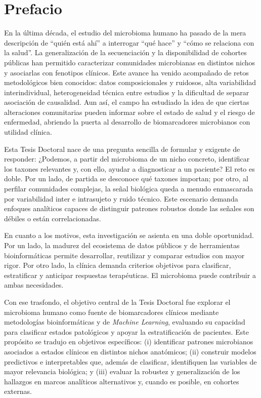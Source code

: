 
\chapter*{\textsf{\textbf{Prefacio}}}

En la última década, el estudio del microbioma humano ha pasado de la mera descripción de “quién está ahí” a interrogar “qué hace” y “cómo se relaciona con la salud”. La generalización de la secuenciación y la disponibilidad de cohortes públicas han permitido caracterizar comunidades microbianas en distintos nichos y asociarlas con fenotipos clínicos. Este avance ha venido acompañado de retos metodológicos bien conocidos: datos composicionales y ruidosos, alta variabilidad interindividual, heterogeneidad técnica entre estudios y la dificultad de separar asociación de causalidad. Aun así, el campo ha estudiado la idea de que ciertas alteraciones comunitarias pueden informar sobre el estado de salud y el riesgo de enfermedad, abriendo la puerta al desarrollo de biomarcadores microbianos con utilidad clínica. 

Esta Tesis Doctoral nace de una pregunta sencilla de formular y exigente de responder: ¿Podemos, a partir del microbioma de un nicho concreto, identificar los taxones relevantes y, con ello, ayudar a diagnosticar a un paciente? El reto es doble. Por un lado, de partida se desconoce qué taxones importan; por otro, al perfilar comunidades complejas, la señal biológica queda a menudo enmascarada por variabilidad inter e intrasujeto y ruido técnico. Este escenario demanda enfoques analíticos capaces de distinguir patrones robustos donde las señales son débiles o están correlacionadas.  

En cuanto a los motivos, esta investigación se asienta en una doble oportunidad. Por un lado, la madurez del ecosistema de datos públicos y de herramientas bioinformáticas permite desarrollar, reutilizar y comparar estudios con mayor rigor. Por otro lado, la clínica demanda criterios objetivos para clasificar, estratificar y anticipar respuestas terapéuticas. El microbioma puede contribuir a ambas necesidades. 

Con ese trasfondo, el objetivo central de la Tesis Doctoral fue explorar el microbioma humano como fuente de biomarcadores clínicos mediante metodologías bioinformáticas y de \textit{Machine Learning}, evaluando su capacidad para clasificar estados patológicos y apoyar la estratificación de pacientes. Este propósito se tradujo en objetivos específicos: (i) identificar patrones microbianos asociados a estados clínicos en distintos nichos anatómicos; (ii) construir modelos predictivos e interpretables que, además de clasificar, identifiquen las variables de mayor relevancia biológica; y (iii) evaluar la robustez y generalización de los hallazgos en marcos analíticos alternativos y, cuando es posible, en cohortes externas. 

